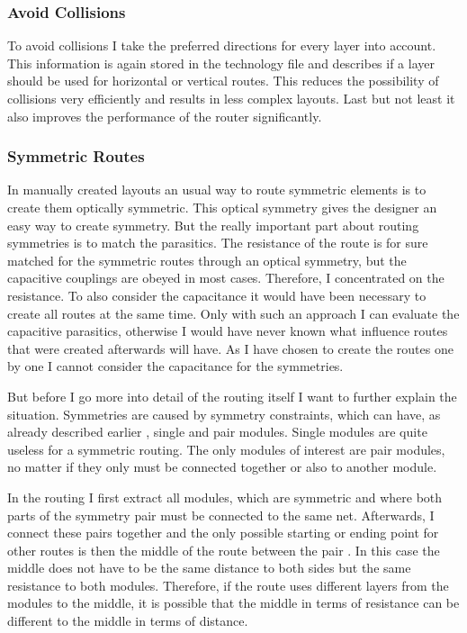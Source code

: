 \subsubsection{Avoid Collisions}
To avoid collisions I take the preferred directions for every layer into account. This information is again stored in the technology file and describes if a layer should be used for horizontal or vertical routes. This reduces the possibility of collisions very efficiently and results in less complex layouts. Last but not least it also improves the performance of the router significantly.

\subsubsection{Symmetric Routes}
In manually created layouts an usual way to route symmetric elements is to create them optically symmetric. This optical symmetry gives the designer an easy way to create symmetry. But the really important part about routing symmetries is to match the parasitics. The resistance of the route is for sure matched for the symmetric routes through an optical symmetry, but the capacitive couplings are obeyed in most cases. Therefore, I concentrated on the resistance. To also consider the capacitance it would have been necessary to create all routes at the same time. Only with such an approach I can evaluate the capacitive parasitics, otherwise I would have never known what influence routes that were created afterwards will have. As I have chosen to create the routes one by one I cannot consider the capacitance for the symmetries.

But before I go more into detail of the routing itself I want to further explain the situation. Symmetries are caused by symmetry constraints, which can have, as already described earlier , single and pair modules. Single modules are quite useless for a symmetric routing. The only modules of interest are pair modules, no matter if they only must be connected together or also to another module.

In the routing I first extract all modules, which are symmetric and where both parts of the symmetry pair must be connected to the same net. Afterwards, I connect these pairs together and the only possible starting or ending point for other routes is then the middle of the route between the pair . In this case the middle does not have to be the same distance to both sides but the same resistance to both modules. Therefore, if the route uses different layers from the modules to the middle, it is possible that the middle in terms of resistance can be different to the middle in terms of distance.

